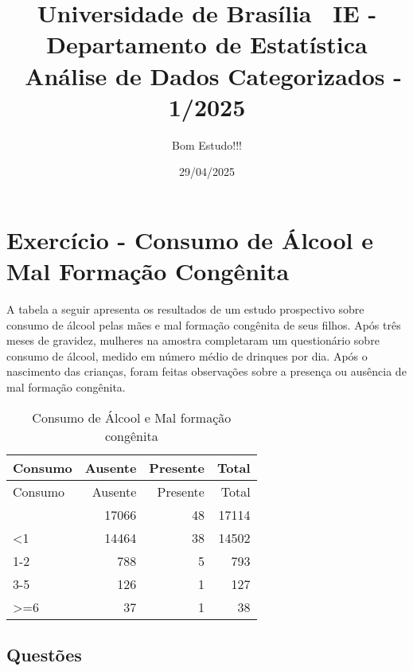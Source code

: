 \documentclass[
]{article}
\title{Universidade de Brasília ~IE - Departamento de Estatística
~Análise de Dados Categorizados - 1/2025}
\author{Bom Estudo!!!}
\date{29/04/2025}
\begin{document}
\maketitle

{
\setcounter{tocdepth}{2}
\tableofcontents
}
\section{Exercício - Consumo de Álcool e Mal Formação
Congênita}\label{exercuxedcio---consumo-de-uxe1lcool-e-mal-formauxe7uxe3o-conguxeanita}

A tabela a seguir apresenta os resultados de um estudo prospectivo sobre
consumo de álcool pelas mães e mal formação congênita de seus filhos.
Após três meses de gravidez, mulheres na amostra completaram um
questionário sobre consumo de álcool, medido em número médio de drinques
por dia. Após o nascimento das crianças, foram feitas observações sobre
a presença ou ausência de mal formação congênita.

\begin{longtable}[]{@{}lrrr@{}}
\caption{Consumo de Álcool e Mal formação congênita}\tabularnewline
\toprule\noalign{}
Consumo & Ausente & Presente & Total \\
\midrule\noalign{}
\endfirsthead
\toprule\noalign{}
Consumo & Ausente & Presente & Total \\
\midrule\noalign{}
\endhead
\bottomrule\noalign{}
\endlastfoot
0 & 17066 & 48 & 17114 \\
\textless1 & 14464 & 38 & 14502 \\
1-2 & 788 & 5 & 793 \\
3-5 & 126 & 1 & 127 \\
\textgreater=6 & 37 & 1 & 38 \\
\end{longtable}

\subsection{Questões}\label{questuxf5es}
\end{document}
